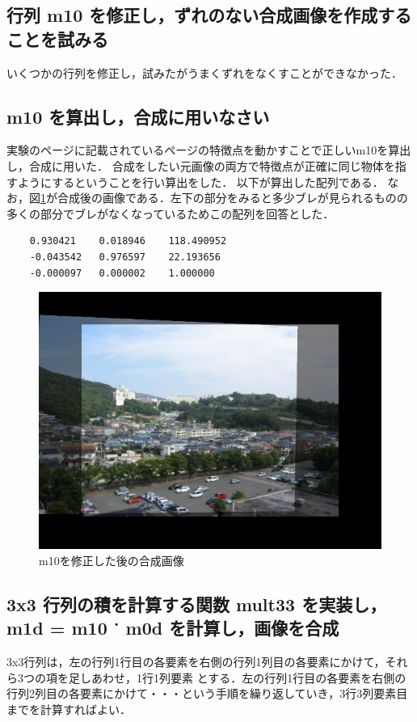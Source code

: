 \documentclass[11pt]{jarticle}
\begin{document}
\subsection{行列 m10 を修正し，ずれのない合成画像を作成することを試みる}
いくつかの行列を修正し，試みたがうまくずれをなくすことができなかった．

\subsection{m10 を算出し，合成に用いなさい}
実験のページに記載されているページの特徴点を動かすことで正しいm10を算出し，合成に用いた．
合成をしたい元画像の両方で特徴点が正確に同じ物体を指すようにするということを行い算出をした．
以下が算出した配列である．
なお，図\ref{2-6.png}が合成後の画像である．左下の部分をみると多少ブレが見られるものの多くの部分でブレがなくなっているためこの配列を回答とした．
\begin{verbatim}
    0.930421    0.018946    118.490952
    -0.043542   0.976597    22.193656
    -0.000097   0.000002    1.000000 
\end{verbatim}
\begin{figure}[h]
    \centering
    \includegraphics[scale=.5]{2-6.png}
    \caption{m10を修正した後の合成画像}
    \label{2-6.png}
\end{figure}

\subsection{3x3 行列の積を計算する関数 mult33 を実装し，m1d = m10 ˙ m0d を計算し，画像を合成}
3x3行列は，左の行列1行目の各要素を右側の行列1列目の各要素にかけて，それら3つの項を足しあわせ，1行1列要素
とする．左の行列1行目の各要素を右側の行列2列目の各要素にかけて・・・という手順を繰り返していき，3行3列要素目までを計算すればよい．
\end{document}
